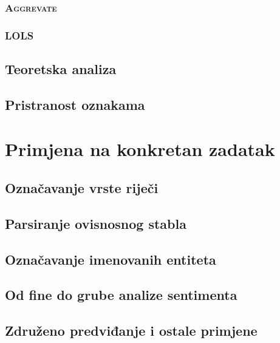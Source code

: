 \documentclass[times, utf8, diplomski]{fer}
\begin{document}
\subsection{\textsc{Aggrevate}}

\subsection{\textsc{LOLS}}\label{ch:LOLS}


\section{Teoretska analiza}
\section{Pristranost oznakama}\label{ch:labelbias}


\chapter{Primjena na konkretan zadatak}

\section{Označavanje vrste riječi}


\section{Parsiranje ovisnosnog stabla}


\section{Označavanje imenovanih entiteta}

\section{Od fine do grube analize sentimenta}

\section{Združeno predviđanje i ostale primjene}

\end{document}
